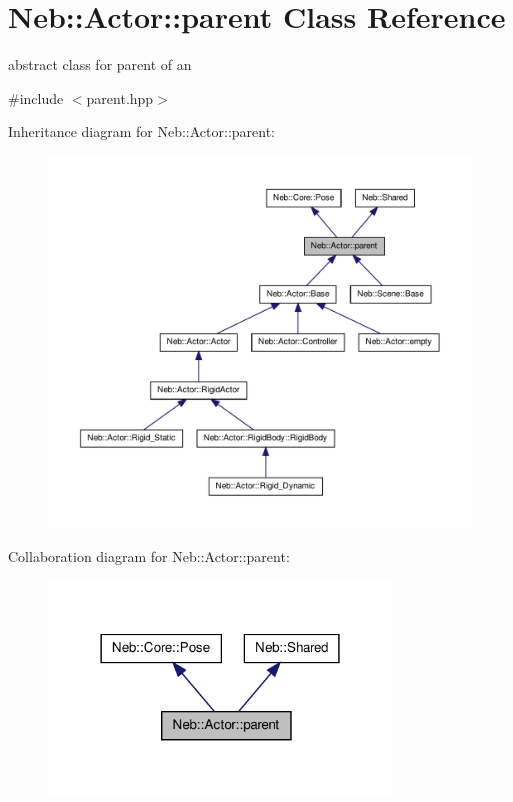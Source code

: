 \hypertarget{classNeb_1_1Actor_1_1parent}{\section{\-Neb\-:\-:\-Actor\-:\-:parent \-Class \-Reference}
\label{classNeb_1_1Actor_1_1parent}
}


abstract class for parent of an   




{\ttfamily \#include $<$parent.\-hpp$>$}



\-Inheritance diagram for \-Neb\-:\-:\-Actor\-:\-:parent\-:\nopagebreak
\begin{figure}[H]
\begin{center}
\leavevmode
\includegraphics[width=350pt]{classNeb_1_1Actor_1_1parent__inherit__graph}
\end{center}
\end{figure}


\-Collaboration diagram for \-Neb\-:\-:\-Actor\-:\-:parent\-:\nopagebreak
\begin{figure}[H]
\begin{center}
\leavevmode
\includegraphics[width=258pt]{classNeb_1_1Actor_1_1parent__coll__graph}
\end{center}
\end{figure}
